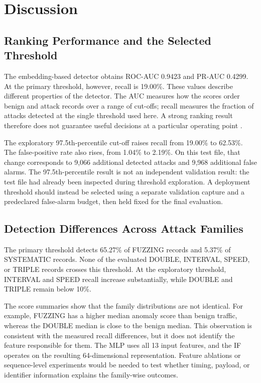 \documentclass[journal]{IEEEtran}
\begin{document}
\section{Discussion}
\subsection{Ranking Performance and the Selected Threshold}
The embedding-based detector obtains ROC-AUC 0.9423 and PR-AUC 0.4299. At the primary threshold, however, recall is 19.00\%. These values describe different properties of the detector. The AUC measures how the scores order benign and attack records over a range of cut-offs; recall measures the fraction of attacks detected at the single threshold used here. A strong ranking result therefore does not guarantee useful decisions at a particular operating point \cite{davis2006prroc}.

The exploratory 97.5th-percentile cut-off raises recall from 19.00\% to 62.53\%. The false-positive rate also rises, from 1.04\% to 2.19\%. On this test file, that change corresponds to 9,066 additional detected attacks and 9,968 additional false alarms. The 97.5th-percentile result is not an independent validation result: the test file had already been inspected during threshold exploration. A deployment threshold should instead be selected using a separate validation capture and a predeclared false-alarm budget, then held fixed for the final evaluation.

\subsection{Detection Differences Across Attack Families}
The primary threshold detects 65.27\% of FUZZING records and 5.37\% of SYSTEMATIC records. None of the evaluated DOUBLE, INTERVAL, SPEED, or TRIPLE records crosses this threshold. At the exploratory threshold, INTERVAL and SPEED recall increase substantially, while DOUBLE and TRIPLE remain below 10\%.

The score summaries show that the family distributions are not identical. For example, FUZZING has a higher median anomaly score than benign traffic, whereas the DOUBLE median is close to the benign median. This observation is consistent with the measured recall differences, but it does not identify the feature responsible for them. The MLP uses all 13 input features, and the IF operates on the resulting 64-dimensional representation. Feature ablations or sequence-level experiments would be needed to test whether timing, payload, or identifier information explains the family-wise outcomes.
\end{document}
